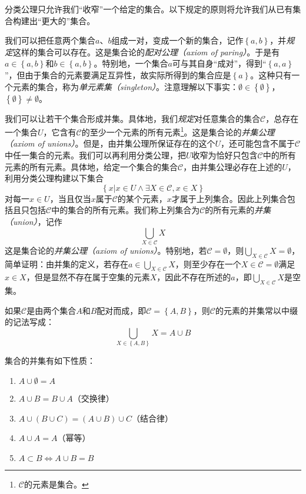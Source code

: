 \documentclass[../main.tex]{subfiles}
\begin{document}
分类公理只允许我们“收窄”一个给定的集合。以下规定的原则将允许我们从已有集合构建出“更大的”集合。

我们可以把任意两个集合$a$、$b$组成一对，变成一个新的集合，记作$\left\{a,b\right\}$，并\emph{规定}这样的集合可以存在。这是集合论的\emph{配对公理（axiom of paring）}。于是有$a\in \left\{a,b\right\}$和$b\in \left\{a,b\right\}$。特别地，一个集合$a$可与其自身“成对”，得到“$\left\{a,a\right\}$”，但由于集合的元素要满足互异性，故实际所得到的集合应是$\left\{a\right\}$。这种只有一个元素的集合，称为\emph{单元素集（singleton）}。注意理解以下事实：$\emptyset\in\left\{\emptyset\right\}$，$\left\{\emptyset\right\}\neq\emptyset$。

我们可以让若干个集合形成并集。具体地，我们\emph{规定}对任意集合的集合$\mathcal{C}$，总存在一个集合$U$，它含有$\mathcal{C}$的至少一个元素的所有元素\footnote{$\mathcal{C}$的元素是集合。}。这是集合论的\emph{并集公理（axiom of unions）}。但是，由并集公理所保证存在的这个$U$，还可能包含不属于$\mathcal{C}$中任一集合的元素。我们可以再利用分类公理，把$U$收窄为恰好只包含$\mathcal{C}$中的所有元素的所有元素。具体地，给定一个集合的集合$\mathcal{C}$，由并集公理必存在上述的$U$，利用分类公理构建以下集合
\begin{equation}\label{eq:set_union}
    \left\{x|x\in U \wedge \exists X\in\mathcal{C},x\in X\right\}
\end{equation}
对每一$x\in U$，当且仅当$x$属于$\mathcal{C}$的某个元素，$x$才属于上列集合。因此上列集合包括且只包括$\mathcal{C}$中的集合的所有元素。我们称上列集合为$\mathcal{C}$的所有元素的\emph{并集（union）}，记作
\[
    \bigcup_{X\in\mathcal{C}}X
\]
这是集合论的\emph{并集公理（axiom of unions）}。特别地，若$\mathcal{C}=\emptyset$，则$\bigcup_{X\in\mathcal{C}}X=\emptyset$，简单证明：由并集的定义，若存在$a\in\bigcup_{X\in\mathcal{C}}X$，则至少存在一个$X\in\mathcal{C}=\emptyset$满足$x\in X$，但是显然不存在属于空集的元素$X$，因此不存在所述的$a$，即$\bigcup_{X\in\mathcal{C}}X$是空集。

如果$\mathcal{C}$是由两个集合$A$和$B$配对而成，即$\mathcal{C}=\left\{A,B\right\}$，则$\mathcal{C}$的元素的并集常以中缀的记法写成：
\[
    \bigcup_{X\in\left\{A,B\right\}}X= A\cup B
\]

集合的并集有如下性质：

\begin{enumerate}
    \item $A\cup \emptyset=A$
    \item $A\cup B=B\cup A$（交换律）
    \item $A\cup\left(B\cup C\right)=\left(A\cup B\right)\cup C$（结合律）
    \item $A\cup A=A$（幂等）
    \item $A\subset B\Leftrightarrow A\cup B=B$
\end{enumerate}
\end{document}
